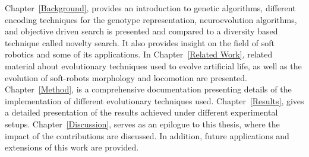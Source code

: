 Chapter~\ref{Background}, provides an introduction to genetic algorithms, different encoding techniques for the genotype representation, neuroevolution algorithms, and objective driven search is presented and compared to a diversity based technique called novelty search. It also provides insight on the field of soft robotics and some of its applications. In Chapter~\ref{Related Work}, related material about evolutionary techniques used to evolve artificial life, as well as the evolution of soft-robots morphology and locomotion are presented. Chapter~\ref{Method}, is a comprehensive documentation presenting details of the implementation of different evolutionary techniques used. Chapter~\ref{Results}, gives a detailed presentation of the results achieved under different experimental setups. Chapter~\ref{Discussion}, serves as an epilogue to this thesis, where the impact of the contributions are discussed. In addition, future applications and extensions of this work are provided.







